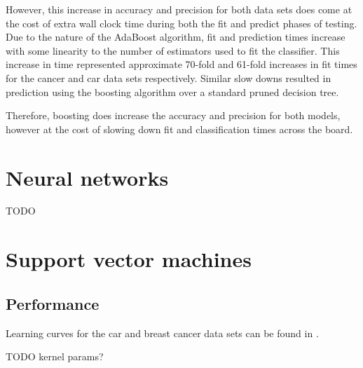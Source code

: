 \documentclass{article}
\begin{document}
    However, this increase in accuracy and precision for both data sets does come at the cost of extra wall clock time during both the fit and predict phases of testing. Due to the nature of the AdaBoost algorithm, fit and prediction times increase with some linearity to the number of estimators used to fit the classifier. This increase in time represented approximate 70-fold and 61-fold increases in fit times for the cancer and car data sets respectively. Similar slow downs resulted in prediction using the boosting algorithm over a standard pruned decision tree.

    Therefore, boosting does increase the accuracy and precision for both models, however at the cost of slowing down fit and classification times across the board.

    \section{Neural networks}
    TODO

    \section{Support vector machines}
    

    \subsection{Performance}

    Learning curves for the car and breast cancer data sets can be found in .

    TODO kernel params?
\end{document}
